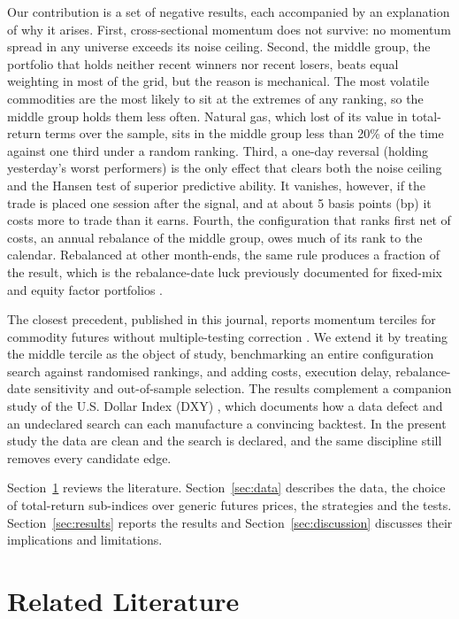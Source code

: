 \documentclass[commodities,article,submit,pdftex,moreauthors]{Definitions/mdpi}
\begin{document}
Our contribution is a set of negative results, each accompanied by an explanation of why it arises. First, cross-sectional momentum does not survive: no momentum spread in any universe exceeds its noise ceiling. Second, the middle group, the portfolio that holds neither recent winners nor recent losers, beats equal weighting in most of the grid, but the reason is mechanical. The most volatile commodities are the most likely to sit at the extremes of any ranking, so the middle group holds them less often. Natural gas, which lost \ngTRAbs{} of its value in total-return terms over the sample, sits in the middle group less than 20\% of the time against one third under a random ranking. Third, a one-day reversal (holding yesterday's worst performers) is the only effect that clears both the noise ceiling and the Hansen test of superior predictive ability. It vanishes, however, if the trade is placed one session after the signal, and at about 5 basis points (bp) it costs more to trade than it earns. Fourth, the configuration that ranks first net of costs, an annual rebalance of the middle group, owes much of its rank to the calendar. Rebalanced at other month-ends, the same rule produces a fraction of the result, which is the rebalance-date luck previously documented for fixed-mix and equity factor portfolios \citep{hoffstein2019,hoffstein2020}.

The closest precedent, published in this journal, reports momentum terciles for commodity futures without multiple-testing correction \citep{adhikari2024}. We extend it by treating the middle tercile as the object of study, benchmarking an entire configuration search against randomised rankings, and adding costs, execution delay, rebalance-date sensitivity and out-of-sample selection. The results complement a companion study of the U.S. Dollar Index (DXY) \citep{meena2026}, which documents how a data defect and an undeclared search can each manufacture a convincing backtest. In the present study the data are clean and the search is declared, and the same discipline still removes every candidate edge.

Section~\ref{sec:lit} reviews the literature. Section~\ref{sec:data} describes the data, the choice of total-return sub-indices over generic futures prices, the strategies and the tests. Section~\ref{sec:results} reports the results and Section~\ref{sec:discussion} discusses their implications and limitations.

\section{Related Literature}\label{sec:lit}
\end{document}
